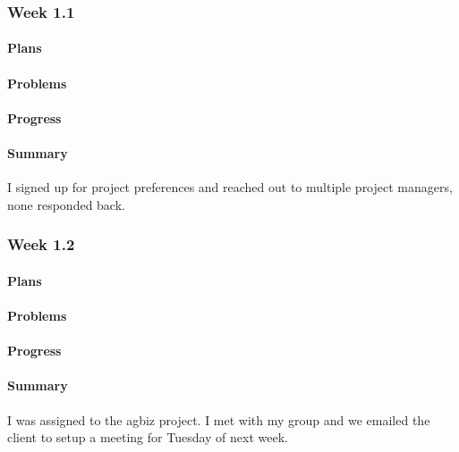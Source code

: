 \documentclass[onecolumn, draftclsnofoot,10pt, compsoc]{article}
\begin{document}
        \subsubsection{Week 1.1}

		    \paragraph{Plans} \hfill \break

		    \paragraph{Problems} \hfill \break

		    \paragraph{Progress} \hfill \break

		    \paragraph{Summary} \hfill \break
		         I signed up for project preferences and reached out to multiple project managers, none responded back. \\

		\subsubsection{Week 1.2}

		    \paragraph{Plans} \hfill \break

		    \paragraph{Problems} \hfill \break

		    \paragraph{Progress} \hfill \break

		    \paragraph{Summary} \hfill \break
		        I was assigned to the agbiz project. I met with my group and we emailed the client to setup a meeting for Tuesday of next week.
		    \\
\end{document}
